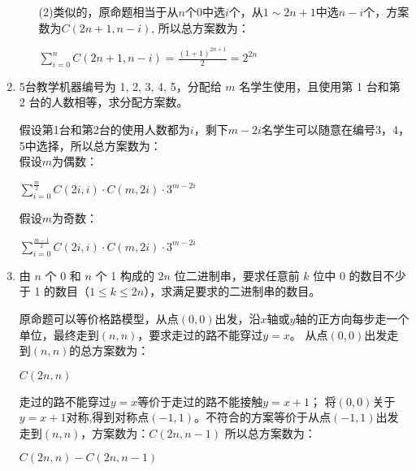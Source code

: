 \documentclass[a4paper]{article}
\begin{document}
\begin{enumerate}
\begin{solution}
\begin{enumerate}
      (2)类似的，原命题相当于从$n$个0中选$i$个，从$1\sim 2n+1$中选$n-i$个，方案数为$C(2n+1,n-i)$,
      所以总方案数为：\\
      \begin{center}
            $\sum_{i=0}^{n}C(2n+1,n-i)=\frac{(1+1)^{2n+1}}{2}=2^{2n}$
      \end{center}
    
\end{enumerate}
\end{solution}

\item 5台教学机器编号为 1, 2, 3, 4, 5，分配给 $m$ 名学生使用，且使用第 1 台和第 2 台的人数相等，求分配方案数。

\begin{solution}
      \begin{enumerate}
      假设第1台和第2台的使用人数都为$i$，剩下$m-2i$名学生可以随意在编号3，4，5中选择，所以总方案数为：\\
      假设$m$为偶数：
      \begin{center}
            $\sum_{i=0}^{\frac{m}{2}}C(2i,i)\cdot C(m,2i)\cdot 3^{m-2i}$\\
      \end{center}
      假设$m$为奇数：
      \begin{center}
            $\sum_{i=0}^{\frac{m-1}{2}}C(2i,i)\cdot C(m,2i)\cdot 3^{m-2i}$\\
      \end{center}
    
\end{enumerate}
\end{solution}

\item 由 $n$ 个 0 和 $n$ 个 1 构成的 $2n$ 位二进制串，要求任意前 $k$ 位中 0 的数目不少于 1 的数目（$1 \leq k \leq 2n$），求满足要求的二进制串的数目。

\begin{solution}
      \begin{enumerate}
      原命题可以等价格路模型，从点$(0,0)$出发，沿$x$轴或$y$轴的正方向每步走一个单位，最终走到$(n,n)$，要求走过的路不能穿过$y=x$。
      从点$(0,0)$出发走到$(n,n)$的总方案数为：
      \begin{center}
            $C(2n,n)$\\
       \end{center}
      
      走过的路不能穿过$y=x$等价于走过的路不能接触$y=x+1$；
      将$(0,0)$关于$y=x+1$对称,得到对称点$(-1,1)$。不符合的方案等价于从点$(-1,1)$出发走到$(n,n)$，方案数为：$C(2n,n-1)$
      所以总方案数为：

      \begin{center}
           $C(2n,n)-C(2n,n-1)$\\
      \end{center}

    
      \end{enumerate}
\end{solution}


\end{enumerate}
\end{document}
